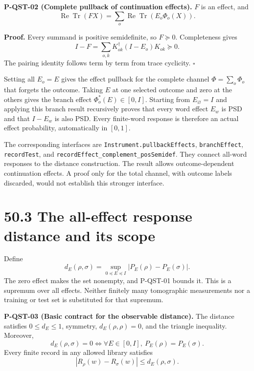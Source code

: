 \documentclass[
  11pt,
  oneside]{book}
\begin{document}
\label{p-qst-02}{}

\textbf{P-QST-02 (Complete pullback of continuation effects).} \(F\) is
an effect, and \[
\operatorname{Re}\operatorname{Tr}(FX)
=\sum_o\operatorname{Re}\operatorname{Tr}(E_o\Phi_o(X)).
\]

\textbf{Proof.} Every summand is positive semidefinite, so
\(F\succeq0\). Completeness gives \[
I-F=\sum_{o,k}K_{ok}^{\dagger}(I-E_o)K_{ok}\succeq0.
\] The pairing identity follows term by term from trace cyclicity.
\(\square\)

Setting all \(E_o=E\) gives the effect pullback for the complete channel
\(\Phi=\sum_o\Phi_o\) that forgets the outcome. Taking \(E\) at one
selected outcome and zero at the others gives the branch effect
\(\Phi_o^*(E)\in[0,I]\). Starting from \(E_\varnothing=I\) and applying
this branch result recursively proves that every word effect \(E_w\) is
PSD and that \(I-E_w\) is also PSD. Every finite-word response is
therefore an actual effect probability, automatically in \([0,1]\).

The corresponding interfaces are \texttt{Instrument.\allowbreak pullback\allowbreak Effects},
\texttt{branch\allowbreak Effect}, \texttt{record\allowbreak Test}, and
\texttt{record\allowbreak Effect\_\allowbreak complement\_\allowbreak pos\allowbreak Semidef}. They connect all-word
responses to the distance construction. The result allows
outcome-dependent continuation effects. A proof only for the total
channel, with outcome labels discarded, would not establish this
stronger interface.

\section{50.3 The all-effect response distance and its scope}

Define \[
d_E(\rho,\sigma)=\sup_{0\preceq E\preceq I}|P_E(\rho)-P_E(\sigma)|.
\] The zero effect makes the set nonempty, and P-QST-01 bounds it. This
is a supremum over all effects. Neither finitely many tomographic
measurements nor a training or test set is substituted for that
supremum.

\label{p-qst-03}{}

\textbf{P-QST-03 (Basic contract for the observable distance).} The
distance satisfies \(0\le d_E\le1\), symmetry, \(d_E(\rho,\rho)=0\), and
the triangle inequality. Moreover, \[
d_E(\rho,\sigma)=0
\iff \forall E\in[0,I],\ P_E(\rho)=P_E(\sigma).
\] Every finite record in any allowed library satisfies \[
|R_\rho(w)-R_\sigma(w)|\le d_E(\rho,\sigma).
\]
\end{document}
